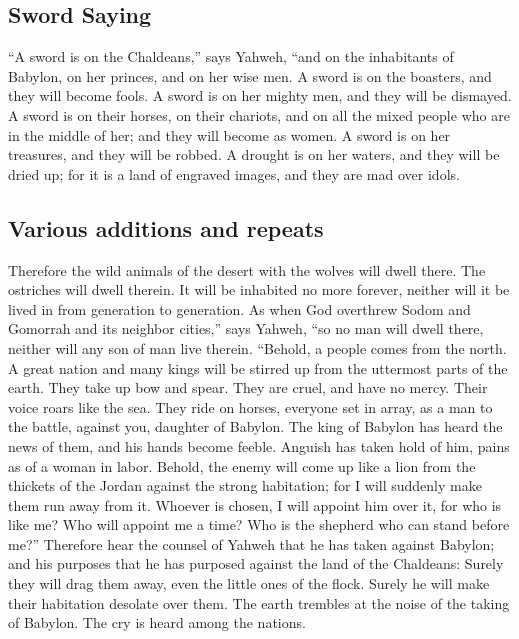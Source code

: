 \hypertarget{sword-saying}{%
\subsection{Sword Saying}\label{sword-saying}}

 ``A sword is on the Chaldeans,'' says Yahweh, ``and on
the inhabitants of Babylon, on her princes, and on her wise men.
 A sword is on the boasters, and they will become fools.
A sword is on her mighty men, and they will be dismayed. 
A sword is on their horses, on their chariots, and on all the mixed
people who are in the middle of her; and they will become as women. A
sword is on her treasures, and they will be robbed.  A
drought is on her waters, and they will be dried up; for it is a land of
engraved images, and they are mad over idols.

\hypertarget{various-additions-and-repeats}{%
\subsection{Various additions and
repeats}\label{various-additions-and-repeats}}

 Therefore the wild animals of the desert with the wolves
will dwell there. The ostriches will dwell therein. It will be inhabited
no more forever, neither will it be lived in from generation to
generation.  As when God overthrew Sodom and Gomorrah and
its neighbor cities,'' says Yahweh, ``so no man will dwell there,
neither will any son of man live therein.  ``Behold, a
people comes from the north. A great nation and many kings will be
stirred up from the uttermost parts of the earth.  They
take up bow and spear. They are cruel, and have no mercy. Their voice
roars like the sea. They ride on horses, everyone set in array, as a man
to the battle, against you, daughter of Babylon.  The
king of Babylon has heard the news of them, and his hands become feeble.
Anguish has taken hold of him, pains as of a woman in labor.
 Behold, the enemy will come up like a lion from the
thickets of the Jordan against the strong habitation; for I will
suddenly make them run away from it. Whoever is chosen, I will appoint
him over it, for who is like me? Who will appoint me a time? Who is the
shepherd who can stand before me?''  Therefore hear the
counsel of Yahweh that he has taken against Babylon; and his purposes
that he has purposed against the land of the Chaldeans: Surely they will
drag them away, even the little ones of the flock. Surely he will make
their habitation desolate over them.  The earth trembles
at the noise of the taking of Babylon. The cry is heard among the
nations.

